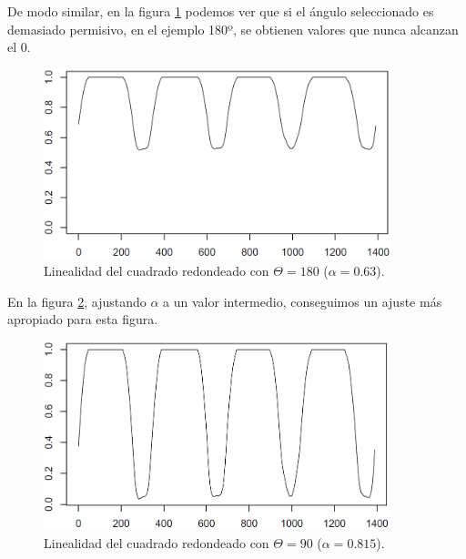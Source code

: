 De modo similar, en la figura \ref{fig7} podemos ver que si el ángulo seleccionado es demasiado permisivo, en el ejemplo 180º, se obtienen valores que nunca alcanzan el 0.\\

\begin{figure}[H]
\begin{center}

\includegraphics[width=0.9\textwidth]{img/lin-dev3-1-limpio-063.png}
\end{center}

\caption{Linealidad del cuadrado redondeado con $\Theta = 180$ ($\alpha = 0.63$).}
\label{fig7}
\end{figure}

En la figura \ref{fig8}, ajustando $\alpha$ a un valor intermedio, conseguimos un ajuste más apropiado para esta figura.\\

\begin{figure}[H]
\begin{center}

\includegraphics[width=0.9\textwidth]{img/lin-dev3-1-limpio-0815.png}
\end{center}

\caption{Linealidad del cuadrado redondeado con $\Theta = 90$ ($\alpha = 0.815$).}
\label{fig8}
\end{figure}

